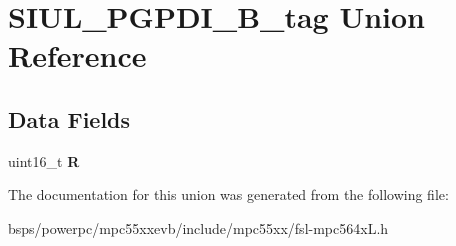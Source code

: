 \hypertarget{unionSIUL__PGPDI__16B__tag}{}\section{S\+I\+U\+L\+\_\+\+P\+G\+P\+D\+I\+\_\+B\+\_\+tag Union Reference}
\label{unionSIUL__PGPDI__16B__tag}
\subsection*{Data Fields}
\begin{DoxyCompactItemize}
\item 
\mbox{\label{unionSIUL__PGPDI__16B__tag_a357088836aea5063a31c905b7f6d6fd5}} 
uint16\+\_\+t {\bfseries R}
\end{DoxyCompactItemize}


The documentation for this union was generated from the following file\+:\begin{DoxyCompactItemize}
\item 
bsps/powerpc/mpc55xxevb/include/mpc55xx/fsl-\/mpc564x\+L.\+h\end{DoxyCompactItemize}
